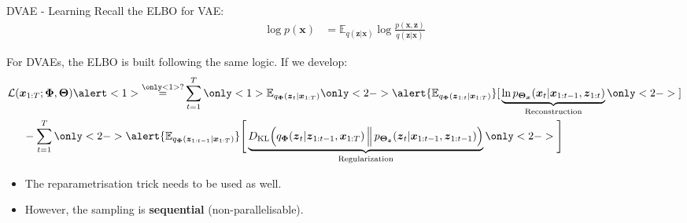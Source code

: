 \documentclass{beamer}
\newcommand{\bs}[1]{\boldsymbol{#1}}
\begin{document}
\begin{frame}{DVAE - Learning}
Recall the ELBO for VAE:
 \begin{align}
\log p(\bs{x}) &= \mathbb{E}_{q(\bs{z}|\bs{x})} \log \frac{p(\bs{x},\bs{z})}{q(\bs{z}|\bs{x})}
\end{align}

For DVAEs, the ELBO is built following the same logic. If we develop:
\begin{align}
  & \mathcal{L}(\bs{x}_{1:T}; \bs{\Phi}, \bs{\Theta}) \alert<1>{\stackrel{\only<1>{?}}{=}}
  \sum_{t=1}^T \only<1>{\mathbb{E}_{q_{\bs{\Phi}}(\bs{z}_{t} | \bs{x}_{1:T})}}\only<2->{\alert{\mathbb{E}_{q_{\bs{\Phi}}(\bs{z}_{1:t} | \bs{x}_{1:T})}} [}\underbrace{\ln p_{\bs{\Theta}_{\bs{x}}}(\bs{x}_{t} | \bs{x}_{1:t-1}, \bs{z}_{1:t})}_{\text{Reconstruction}}\only<2->{]}\\
  \nonumber& \hspace{5mm} - \sum_{t=1}^T \only<2->{\alert{\mathbb{E}_{q_{\bs{\Phi}}(\bs{z}_{1:t-1} | \bs{x}_{1:T})}} \Bigg[} \underbrace{D_{\text{KL}}\Big(q_{\bs{\Phi}}(\bs{z}_{t} | \bs{z}_{1:t-1}, \bs{x}_{1:T}) \,\Big\lVert\, p_{\bs{\Theta}_{\bs{z}}}(\bs{z}_{t} | \bs{x}_{1:t-1},  \bs{z}_{1:t-1})\Big)}_{\text{Regularization}} \only<2->{\Bigg]}  
\end{align}
\pause
\begin{itemize}
  \item The reparametrisation trick needs to be used as well.
  \item However, the sampling is \textbf{sequential} (non-parallelisable).
\end{itemize}
\end{frame}
\end{document}
